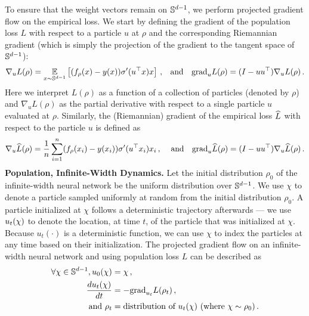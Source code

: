To ensure that the weight vectors remain on $\mathbb{S}^{d - 1}$, we perform projected gradient flow on the empirical loss.  We start by defining the gradient of the population loss $L$ with respect to a particle $u$ at $\rho$ and the corresponding Riemannian gradient (which is simply the projection of the gradient to the tangent space of $\mathbb{S}^{d - 1}$):
\begin{align} \label{eq:projected_gradient_flow_population}
    \nabla_{u} L(\rho) & = \operatorname*{\mathbb{E}}_{x\sim \mathbb{S}^{d-1}}\left[(f_\rho(x)-y(x))\sigma'(u^\top x) x\right]\,,&\textup{and ~~} {\textup{grad}}_{u} L(\rho) = (I-uu^\top) \nabla_{u} L(\rho) \,.
\end{align}
Here we interpret $L(\rho)$ as a function of a collection of particles (denoted by $\rho$) and $\nabla_u L(\rho)$ as the partial derivative with respect to a single particle $u$ evaluated at $\rho$. Similarly, the (Riemannian) gradient of the empirical loss $\widehat{L}$ with respect to the particle $u$ is defined as
\begin{align}
\label{eq:projected_gradient_flow_empirical}
    \nabla_{u} \widehat{L}(\rho) & = \frac{1}{n}\sum_{i=1}^n (f_\rho(x_i)-y(x_i))\sigma'(u^\top x_i) x_i\,, & \textup{ and ~~} {\textup{grad}}_{u} \widehat{L}(\rho) = (I-uu^\top) \nabla_{u} \widehat{L}(\rho) \,. 
\end{align}
\noindent \textbf{Population, Infinite-Width Dynamics.}
Let the initial distribution $\rho_0$ of the infinite-width neural network be the uniform distribution over $\mathbb{S}^{d-1}$. We use $\chi$ to denote a particle sampled uniformly at random from the initial distribution $\rho_0$. A particle initialized at $\chi$ follows a deterministic trajectory afterwards --- we use $u_t(\chi)$ to denote the location, at time $t$, of the particle that was initialized at $\chi$. Because $u_t(\cdot)$ is a deterministic function, we can use $\chi$ to index the particles at any time based on their initialization. The projected gradient flow on an infinite-width neural network and using population loss $L$ can be described as 
\begin{align}
\forall \chi \in \mathbb{S}^{d - 1}, u_0(\chi) & = \chi \label{eq:population_init} \,, \\
\frac{du_t(\chi)}{dt} & = - {\textup{grad}}_{u_t} L(\rho_t) \label{eq:population_derivative} \,, \\
\text{ and }\rho_t & = \textup{distribution of $u_t(\chi)$ (where $\chi \sim \rho_0$)} \,. \label{eq:rho_t} 
\end{align}



